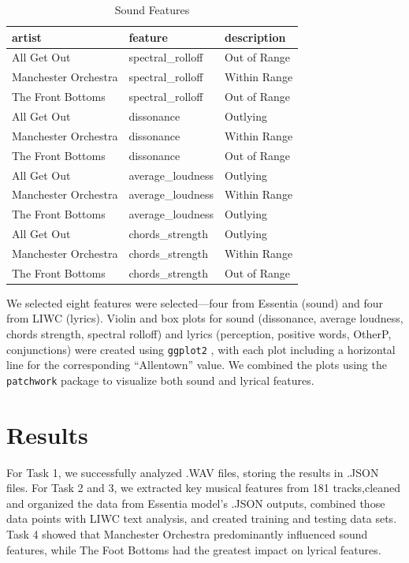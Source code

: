 \documentclass{article}\usepackage[]{graphicx}\usepackage[]{xcolor}
\begin{document}
\begin{multicols}{2}
\begin{table}[H]
\centering
\begingroup\small
\begin{tabular}{lll}
  \hline
artist & feature & description \\ 
  \hline
All Get Out & spectral\_rolloff & Out of Range \\ 
  Manchester Orchestra & spectral\_rolloff & Within Range \\ 
  The Front Bottoms & spectral\_rolloff & Out of Range \\ 
  All Get Out & dissonance & Outlying \\ 
  Manchester Orchestra & dissonance & Within Range \\ 
  The Front Bottoms & dissonance & Out of Range \\ 
  All Get Out & average\_loudness & Outlying \\ 
  Manchester Orchestra & average\_loudness & Within Range \\ 
  The Front Bottoms & average\_loudness & Outlying \\ 
  All Get Out & chords\_strength & Outlying \\ 
  Manchester Orchestra & chords\_strength & Within Range \\ 
  The Front Bottoms & chords\_strength & Out of Range \\ 
   \hline
\end{tabular}
\endgroup
\caption{Sound Features} 
\end{table}

We selected eight features were selected—four from Essentia (sound) and four from LIWC (lyrics). Violin and box plots for sound (dissonance, average loudness, chords strength, spectral rolloff) and lyrics (perception, positive words, OtherP, conjunctions) were created using \texttt{ggplot2} \citep{Ggplot2}, with each plot including a horizontal line for the corresponding ``Allentown” value. We combined the plots using the \texttt{patchwork} package \citep{Patchwork} to visualize both sound and lyrical features.

\section{Results}
For Task 1, we successfully analyzed .WAV files, storing the results in .JSON files. For Task 2 and 3, we extracted key musical features from 181 tracks,cleaned and organized the data from Essentia model's .JSON outputs, combined those data points with LIWC text analysis, and created training and testing data sets\citep{Bogdanov}\citep{Boyd2022}. 
Task 4 showed that Manchester Orchestra predominantly influenced sound features, while The Foot Bottoms had the greatest impact on lyrical features. 


\end{multicols}
\end{document}

